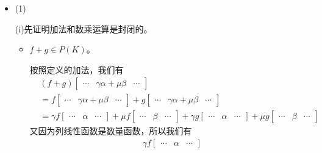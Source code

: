 \documentclass{article}
\begin{document}
\begin{itemize}
  \item (1)

        (i)先证明加法和数乘运算是封闭的。

        \begin{itemize}
          \item $f + g \in P(K)$。

                按照定义的加法，我们有
                \begin{align*}
                   & (f + g) \begin{bmatrix}
                               \cdots & \gamma \alpha + \mu \beta & \cdots
                             \end{bmatrix}               \\
                   & = f \begin{bmatrix}
                           \cdots & \gamma \alpha + \mu \beta & \cdots
                         \end{bmatrix} + g \begin{bmatrix}
                                             \cdots & \gamma \alpha + \mu \beta & \cdots
                                           \end{bmatrix} \\
                   & = \gamma f \begin{bmatrix}
                                  \cdots & \alpha & \cdots
                                \end{bmatrix}
                  + \mu f \begin{bmatrix}
                            \cdots & \beta & \cdots
                          \end{bmatrix}
                  + \gamma g \begin{bmatrix}
                               \cdots & \alpha & \cdots
                             \end{bmatrix}
                  + \mu g \begin{bmatrix}
                            \cdots & \beta & \cdots
                          \end{bmatrix}
                \end{align*}
                又因为列线性函数是数量函数，所以我们有
                \begin{align*}
                   & \gamma f \begin{bmatrix}
                                \cdots & \alpha & \cdots
                              \end{bmatrix}

\end{align*}
\end{itemize}
\end{itemize}
\end{document}

